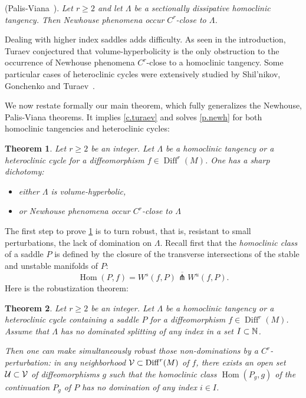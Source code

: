 \documentclass[11pt, a4paper]{amsart}
\theoremstyle{plain}
\newtheorem{theorem}{Theorem} %
\theoremstyle{definition}
\theoremstyle{remark}
\numberwithin{equation}{section}         %
\DeclareMathOperator{\Diff}{{Diff}}
\def\Diff{\operatorname{Diff}}
\def\Hom{\operatorname{Hom}}
\begin{document}
 
  (Palis-Viana~\cite{PV}). {\em Let $r\geq 2$ and let $\Lambda$ be a sectionally dissipative homoclinic tangency. Then Newhouse phenomena occur $C^r$-close to $\Lambda$. }
\medskip
 
Dealing with higher index saddles adds difficulty. As seen in the introduction, Turaev conjectured that volume-hyperbolicity is the only obstruction to the occurrence of Newhouse phenomena $C^r$-close to a homoclinic tangency.
Some particular cases of heteroclinic cycles were extensively studied by Shil'nikov, Gonchenko and Turaev~\cite{GST1,GST3}. 

We now restate formally our main theorem, which fully generalizes the Newhouse, Palis-Viana theorems. It implies  \cref{c.turaev} and solves \cref{p.newh} for both homoclinic tangencies and heteroclinic cycles:
  
\begin{theorem}\label{t.lambda}
Let $r\geq 2$ be an integer. Let $\Lambda$ be a homoclinic tangency or a heteroclinic cycle for a diffeomorphism $f\in \Diff^r(M)$. One has a sharp dichotomy:
\begin{itemize}
\item either $\Lambda$ is volume-hyperbolic,
\item or  Newhouse phenomena occur $C^r$-close to $\Lambda$
\end{itemize}
\end{theorem}


The first step to prove \cref{t.lambda} is to turn robust, that is, resistant to small perturbations, the lack of domination on $\Lambda$. 
Recall first that the {\em homoclinic class} of a saddle $P$ is defined by the closure of the transverse intersections of the stable and unstable manifolds of $P$:
$$\Hom(P,f)=\overline{W^s(f,P)\pitchfork W^u(f,P)}.$$
Here is the robustization theorem:

\begin{theorem}\label{t.robustization}
Let $r\geq 2$ be an integer.  Let $\Lambda$ be a homoclinic tangency or a heteroclinic cycle containing a saddle $P$  for a diffeomorphism $f\in \Diff^r(M)$. Assume that $\Lambda$ has no dominated splitting of any index in a set $I\subset {\mathbb N}$. 


Then one can make simultaneously robust  those non-dominations by a $C^r$-perturbation: in any neighborhood $\cV\subset \Diff^r(M)$ of $f$, there exists an open set ${\mathcal U}\subset {\mathcal V}$ of diffeomorphisms $g$ such that the homoclinic class $\Hom(P_g,g)$ of the continuation $P_g$ of $P$ has no domination of any index $i\in I$.
\end{theorem}
\end{document}
